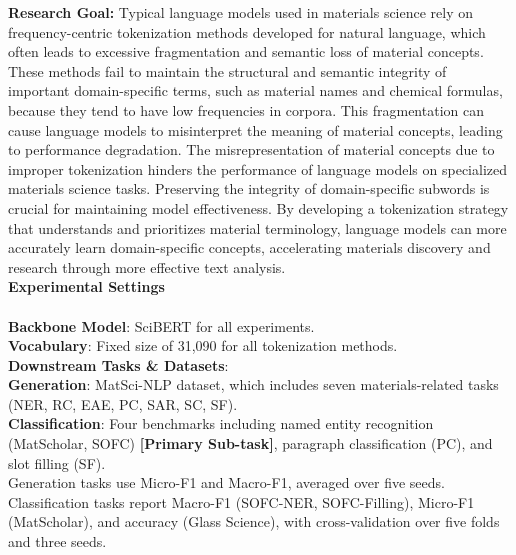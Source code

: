 \documentclass[11pt]{article}
\theoremstyle{plain}
\theoremstyle{definition}
\theoremstyle{remark}
\begin{document}
\begin{tcolorbox}[
    colback=white,
    colframe=myPastelGreen,
    title=\textbf{\textcolor{black}{Task Description}},
    boxrule=0.5mm,
    width=\linewidth,
    arc=2mm,
    boxsep=5pt,
    left=6pt, right=6pt, top=6pt, bottom=6pt,
]

\textbf{Research Goal:}
Typical language models used in materials science rely on frequency-centric tokenization methods developed for natural language, which often leads to excessive fragmentation and semantic loss of material concepts. These methods fail to maintain the structural and semantic integrity of important domain-specific terms, such as material names and chemical formulas, because they tend to have low frequencies in corpora. This fragmentation can cause language models to misinterpret the meaning of material concepts, leading to performance degradation. The misrepresentation of material concepts due to improper tokenization hinders the performance of language models on specialized materials science tasks. Preserving the integrity of domain-specific subwords is crucial for maintaining model effectiveness. By developing a tokenization strategy that understands and prioritizes material terminology, language models can more accurately learn domain-specific concepts, accelerating materials discovery and research through more effective text analysis.\\

\textbf{Experimental Settings}\\\\
\textbf{Backbone Model}: SciBERT for all experiments.\\
\textbf{Vocabulary}: Fixed size of 31,090 for all tokenization methods.\\
\textbf{Downstream Tasks \& Datasets}:\\
    \textbf{Generation}: MatSci-NLP dataset, which includes seven materials-related tasks (NER, RC, EAE, PC, SAR, SC, SF).\\
    \textbf{Classification}: Four benchmarks including named entity recognition (MatScholar, SOFC) \textbf{[Primary Sub-task]}, paragraph classification (PC), and slot filling (SF).\\
    Generation tasks use Micro-F1 and Macro-F1, averaged over five seeds. Classification tasks report Macro-F1 (SOFC-NER, SOFC-Filling), Micro-F1 (MatScholar), and accuracy (Glass Science), with cross-validation over five folds and three seeds.\\


\end{tcolorbox}
\end{document}
